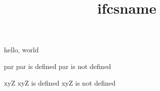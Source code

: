 \documentclass{amsart}
\title{ifcsname}
\begin{document}
\maketitle

hello, world

\ifcsname par\endcsname
    par is defined
\else
    par is not defined
\fi

\ifcsname xyZ\endcsname
    xyZ is defined
\else
    xyZ is not defined
\fi
\end{document}
